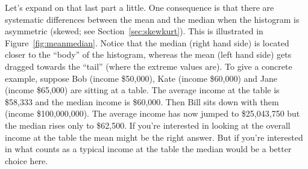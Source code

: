 Let's expand on that last part a little. One consequence is that there are systematic differences between the mean and the median when the histogram is asymmetric (skewed; see Section~\ref{sec:skewkurt}). This is illustrated in Figure~\ref{fig:meanmedian}. Notice that the median (right hand side) is located closer to the ``body'' of the histogram, whereas the mean (left hand side) gets dragged towards the ``tail'' (where the extreme values are). To give a concrete example, suppose Bob (income \$50,000), Kate (income \$60,000) and Jane (income \$65,000) are sitting at a table. The average income at the table is \$58,333 and the median income is \$60,000. Then Bill sits down with them (income \$100,000,000). The average income has now jumped to \$25,043,750 but the median rises only to \$62,500. If you're interested in looking at the overall income at the table the mean might be the right answer. But if you're interested in what counts as a typical income at the table the median would be a better choice here.


